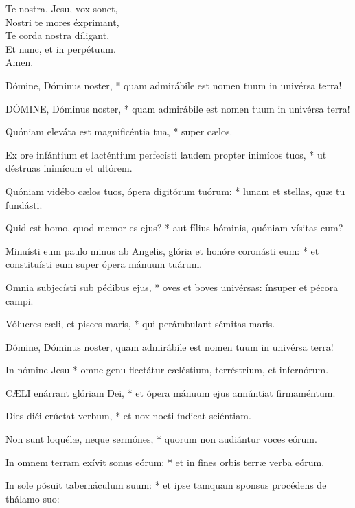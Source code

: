 
Te nostra, Jesu, vox sonet,\\
Nostri te mores éxprimant,\\
Te corda nostra díligant,\\
Et nunc, et in perpétuum.\\
Amen.


 Dómine, Dóminus noster, * quam admirábile est nomen tuum in univérsa terra!


\lettrine[lines=2]{D}{ÓMINE}, Dóminus noster, * quam admirábile est nomen tuum in univérsa terra!

Quóniam eleváta est magnificéntia tua, * super cælos.

Ex ore infántium et lacténtium perfecísti laudem propter inimícos tuos, * ut déstruas inimícum et ultórem.

Quóniam vidébo cælos tuos, ópera digitórum tuórum: * lunam et stellas, quæ tu fundásti.

Quid est homo, quod memor es ejus? * aut fílius hóminis, quóniam vísitas eum?

Minuísti eum paulo minus ab Angelis, glória et honóre coronásti eum: * et constituísti eum super ópera mánuum tuárum.

Omnia subjecísti sub pédibus ejus, * oves et boves univérsas: ínsuper et pécora campi.

Vólucres cæli, et pisces maris, * qui perámbulant sémitas maris.

 Dómine, Dóminus noster, quam admirábile est nomen tuum in univérsa terra!

 In nómine Jesu * omne genu flectátur cæléstium, terréstrium, et infernórum.


\lettrine[lines=2]{C}{ÆLI} enárrant glóriam Dei, * et ópera mánuum ejus annúntiat firmaméntum.

Dies diéi erúctat verbum, * et nox nocti índicat sciéntiam.

Non sunt loquélæ, neque sermónes, * quorum non audiántur voces eórum.

In omnem terram exívit sonus eórum: * et in fines orbis terræ verba eórum.

In sole pósuit tabernáculum suum: * et ipse tamquam sponsus procédens de thálamo suo:

